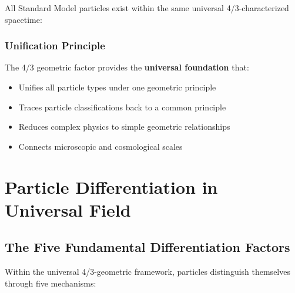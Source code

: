 	All Standard Model particles exist within the same universal 4/3-characterized spacetime:
	
	\begin{table}[htbp]
		\centering
		\caption{Universal 4/3 geometry for all particles}
		\label{tab:universal_geometry}
	\end{table}
	
	\subsubsection{Unification Principle}
	\label{subsubsec:unification_principle}
	
	The 4/3 geometric factor provides the \textbf{universal foundation} that:
	\begin{itemize}
		\item Unifies all particle types under one geometric principle
		\item Traces particle classifications back to a common principle
		\item Reduces complex physics to simple geometric relationships
		\item Connects microscopic and cosmological scales
	\end{itemize}
	
	\section{Particle Differentiation in Universal Field}
	\label{sec:particle_differentiation}
	
	\subsection{The Five Fundamental Differentiation Factors}
	\label{subsec:five_factors}
	
	Within the universal 4/3-geometric framework, particles distinguish themselves through five mechanisms:
	
